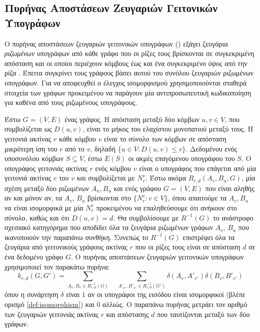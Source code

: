 \subsection{Πυρήνας Αποστάσεων Ζευγαριών Γειτονικών Υπογράφων}
\label{ssec:nspdk}
Ο πυρήνας αποστάσεων ζευγαριών γειτονικών υπογράφων () εξάγει ζευγάρια \textit{ριζωμένων} υπογράφων από κάθε γράφο που οι ρίζες τους βρίσκονται σε συγκεκριμένη απόσταση και οι οποίοι περιέχουν κόμβους έως και ένα συγκεκριμένο \textit{ύψος} από την ρίζα \cite{costa2010fast}.
Έπειτα συγκρίνει τους γράφους βάσει αυτού του συνόλου ζευγαριών ριζωμένων υπογράφων.
Για να αποφευχθεί ο έλεγχος ισομορφισμού χρησιμοποιούνται σταθερά στοιχεία των γράφων προκειμένου να παράγουν μία αντιπροσωπευτική κωδικοποίηση για καθένα από τους ριζωμένους υπογράφους.\par
Έστω $G=(V,E)$ ένας γράφος.
Η απόσταση μεταξύ δύο κόμβων $u,v \in V$, που συμβολίζεται ως $D(u,v)$, είναι το μήκος του ελαχίστου μονοπατιού μεταξύ τους.
Η γειτονιά ακτίνας $r$ κάθε κόμβου $v$ είναι το σύνολο των κόμβων σε απόσταση μικρότερη ίση του $r$ από το $v$, δηλαδή $\{ u \in V : D(u,v) \leq r\}$.
Δεδομένου ενός υποσυνόλου κόμβων $S \subseteq V$, έστω $E(S)$ οι ακμές επαγόμενου υπογράφου του $S$.
Ο υπογράφος γειτονιάς ακτίνας $r$ ενός κόμβου $v$ είναι ο υπογράφος που επάγεται από μία γειτονιά ακτίνας $r$ του $v$ και συμβολίζεται με $N_r^v$.
Έστω ακόμα $R_{r,d}(A_v,B_u,G)$, μία σχέση μεταξύ δύο ριζωμένων $A_{u}, B_{u}$ και ενός γράφου $G=(V,E)$ που είναι αληθής αν και μόνον αν, τα $A_v$, $B_u$ βρίσκονται στο $\{N_r^v : v \in V \}$, όπου απαιτούμε τα $A_v, B_u$ να είναι ισομορφικά με μία $N_r^v$ προκειμένου να επαληθεύσουμε ότι ανήκουν στο σύνολο, καθώς και ότι $D(u,v) = d$.
Θα συμβολίσουμε με $R^{-1}(G)$ το ανάστροφο σχεσιακό κατηγόρημα που αποδίδει όλα τα ζευγάρια ριζωμένων γράφων $A_v$, $B_u$ που ικανοποιούν την παραπάνω συνθήκη.
Συνεπώς το $R^{-1}(G)$ επιστρέφει όλα τα ζευγάρια από γειτονικούς γράφους ακτίνας $r$ που οι ρίζες τους είναι σε απόσταση $d$ σε ένα δεδομένο γράφο $G$.
Ο πυρήνας αποστάσεων ζευγαριών γειτονικών υπογράφων χρησιμοποιεί τον παρακάτω πυρήνα:
\begin{equation}
    k_{r,d}(G, G') = \sum_{A_v, B_v \in R_{r,d}^{-1}(G)} \quad \sum_{A'_{v'}, B'_{v'} \in R_{r,d}^{-1}(G')} \delta(A_v, A'_{v'}) \delta(B_v, B'_{v'})
\end{equation}
όπου η συνάρτηση $\delta$ είναι $1$ αν οι υπογράφοι της εισόδου είναι ισομορφικοί (βλέπε ορισμό \ref{def:isomorphism}) και $0$ αλλιώς.
Ο παραπάνω πυρήνας μετράει τον αριθμό των ζευγαριών γειτονιάς ακτίνας $r$ και απόστασης $d$ που ταυτίζονται μεταξύ των δύο γράφων.
